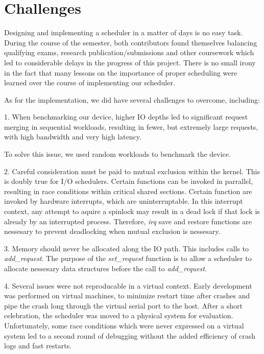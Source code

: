 \section{Challenges}

Designing and implementing a scheduler in a matter of days is no easy
task. During the course of the semester, both contributors found
themselves balancing qualifying exams, research
publication/submissions and other coursework which led to considerable
delays in the progress of this project. There is no small irony in the
fact that many lessons on the importance of proper scheduling were
learned over the course of implementing our scheduler.

As for the implementation, we did have several challenges to overcome, including:

1. When benchmarking our device, higher IO depths led to significant
request merging in sequential workloads, resulting in fewer, but
extremely large requests, with high bandwidth and very high latency.
    
To solve this issue, we used random workloads to benchmark the device.

2. Careful consideration must be paid to mutual exclusion within the
kernel. This is doubly true for I/O schedulers. Certain functions can
be invoked in parrallel, resulting in race conditions within critical
shared sections. Certain function are invoked by hardware interrupts,
which are uninterruptable. In this interrupt context, any attempt to
aquire a spinlock may result in a dead lock if that lock is already by
an interrupted process. Therefore, \emph{irq} save and restore
functions are nessesary to prevent deadlocking when mutual exclusion
is nessesary.

3. Memory should never be allocated along the IO path. This includes
calls to \emph{add\_request}. The purpose of the \emph{set\_request}
function is to allow a scheduler to allocate nessesary data structures
before the call to \emph{add\_request}. 

4. Several issues were not reproducable in a virtual context. Early
development was performed on virtual machines, to minimize restart
time after crashes and pipe the crash long through the virtual serial
port to the host. After a short celebration, the scheduler was moved
to a physical system for evaluation. Unfortunately, some race
conditions which were never expressed on a virtual system led to a
second round of debugging without the added efficiency of crash logs
and fast restarts.
